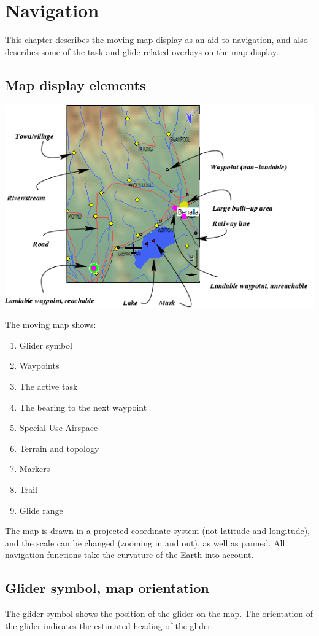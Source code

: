 \chapter{Navigation}\label{cha:navigation}
This chapter describes the moving map display as an aid to navigation,
and also describes some of the task and glide related overlays on the
map display.

\section{Map display elements}

\begin{maxipage}
\includegraphics[angle=0,width=0.9\linewidth,keepaspectratio='true']{figures/fig-map.png}
\end{maxipage}

The moving map shows:
\begin{enumerate} 
\item Glider symbol
\item Waypoints
\item The active task
\item The bearing to the next waypoint
\item Special Use Airspace
\item Terrain and topology
\item Markers
\item Trail
\item Glide range
\end{enumerate}
The map is drawn in a projected coordinate system (not latitude and
longitude), and the scale can be changed (zooming in and out), as well
as panned.  All navigation functions take the curvature of the Earth
into account.

\section{Glider symbol, map orientation}
The glider symbol shows the position of the glider on the map.  The
orientation of the glider indicates the estimated heading of the
glider.

